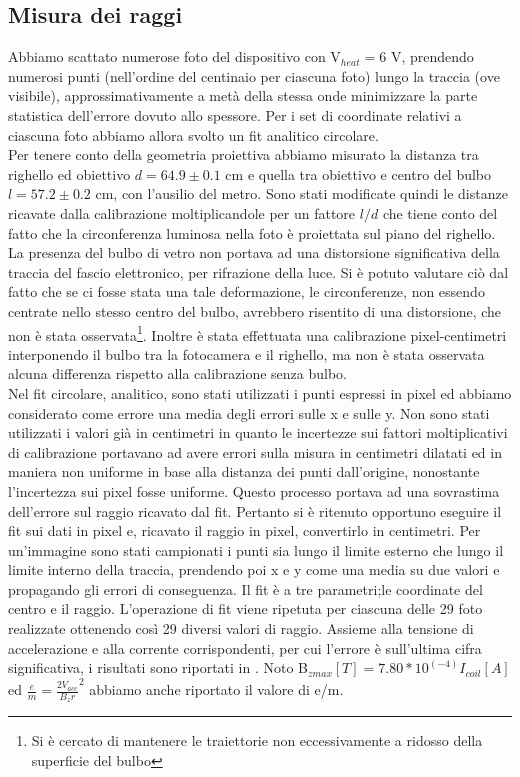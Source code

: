 \subsection{Misura dei raggi}
Abbiamo scattato numerose foto del dispositivo con V$_{heat} = 6$ V, prendendo numerosi punti (nell'ordine del centinaio per ciascuna foto) lungo la traccia (ove visibile), approssimativamente a metà della stessa onde minimizzare la parte statistica dell'errore dovuto allo spessore. Per i set di coordinate relativi a ciascuna foto abbiamo allora svolto un fit analitico circolare.\\
 Per tenere conto della geometria proiettiva abbiamo misurato la distanza tra righello ed obiettivo $d=64.9 \pm 0.1$ cm e quella tra obiettivo e centro del bulbo $l=57.2 \pm 0.2$ cm, con l'ausilio del metro. Sono stati modificate quindi le distanze ricavate dalla calibrazione moltiplicandole per un fattore $l/d$ che tiene conto del fatto che la circonferenza luminosa nella foto è proiettata sul piano del righello.\\
 La presenza del bulbo di vetro non portava ad una distorsione significativa della traccia del fascio elettronico, per rifrazione della luce. Si è potuto valutare ciò dal fatto che se ci fosse stata una tale deformazione, le circonferenze, non essendo centrate nello stesso centro del bulbo, avrebbero risentito di una distorsione, che non è stata osservata\footnote{Si è cercato di mantenere le traiettorie non eccessivamente a ridosso della superficie del bulbo}. Inoltre è stata effettuata una calibrazione pixel-centimetri interponendo il bulbo tra la fotocamera e il righello, ma non è stata osservata alcuna differenza rispetto alla calibrazione senza bulbo.\\
Nel fit circolare, analitico, sono stati utilizzati i punti espressi in pixel ed abbiamo considerato come errore una media degli errori sulle x e sulle y. Non sono stati utilizzati i valori già in centimetri in quanto le incertezze sui fattori moltiplicativi di calibrazione  portavano ad avere errori sulla misura in centimetri dilatati ed in maniera non uniforme in base alla distanza dei punti dall'origine, nonostante l'incertezza sui pixel fosse uniforme. Questo processo portava ad una sovrastima dell'errore sul raggio ricavato dal fit. Pertanto si è ritenuto opportuno eseguire il fit sui dati in pixel e, ricavato il raggio in pixel, convertirlo in centimetri.
 Per un'immagine sono stati campionati i punti sia lungo il limite esterno che lungo il limite interno della traccia, prendendo poi x e y come una media su due valori e propagando gli errori di conseguenza. Il fit è a tre parametri;le coordinate del centro e il raggio. L'operazione di fit viene ripetuta per ciascuna delle 29 foto realizzate ottenendo così 29 diversi valori di raggio. Assieme alla tensione di accelerazione e alla corrente corrispondenti, per cui l'errore è sull'ultima cifra significativa, i risultati sono riportati in . Noto B$_{zmax}[T] = 7.80*10^(-4)I_{coil}[A]$ ed $\frac{e}{m}= \frac{2V_{acc}}{{B_{z}r}}^2$ abbiamo anche riportato il valore di e/m.\\

